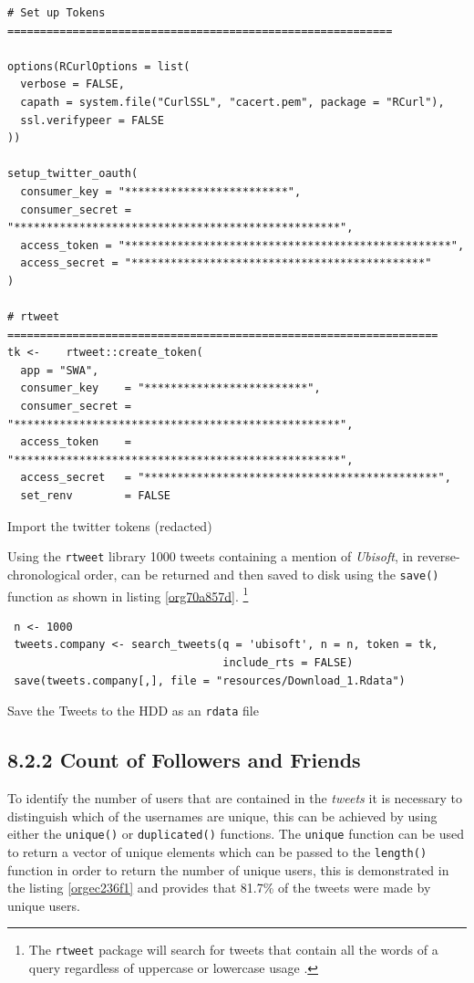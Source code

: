 \documentclass[11pt]{article}
\begin{document}
\begin{listing}[htbp]
\begin{verbatim}
# Set up Tokens ===========================================================

options(RCurlOptions = list(
  verbose = FALSE,
  capath = system.file("CurlSSL", "cacert.pem", package = "RCurl"),
  ssl.verifypeer = FALSE
))

setup_twitter_oauth(
  consumer_key = "*************************",
  consumer_secret = "**************************************************",
  access_token = "**************************************************",
  access_secret = "*********************************************"
)

# rtweet ==================================================================
tk <-    rtweet::create_token(
  app = "SWA",
  consumer_key    = "*************************",
  consumer_secret = "**************************************************",
  access_token    = "**************************************************",
  access_secret   = "*********************************************",
  set_renv        = FALSE
\end{verbatim}
\caption{\label{org568a978}Import the twitter tokens (redacted)}
\end{listing}

Using the \texttt{rtweet} library 1000 tweets containing a mention of \emph{Ubisoft}, in
reverse-chronological order, can be returned and then saved to disk using the
\texttt{save()} function as shown in listing \ref{org70a857d}. \footnote{The \texttt{rtweet} package will search for tweets that contain all the words of a query
regardless of uppercase or lowercase usage \cite{kearney2019}.}

\begin{listing}[htbp]
\begin{verbatim}
 n <- 1000
 tweets.company <- search_tweets(q = 'ubisoft', n = n, token = tk,
                                 include_rts = FALSE)
 save(tweets.company[,], file = "resources/Download_1.Rdata")
\end{verbatim}
\caption{\label{org70a857d}Save the Tweets to the HDD as an \texttt{rdata} file}
\end{listing}

\subsection{8.2.2 Count of Followers and Friends}
\label{sec:org7e08fb2}
To identify the number of users that are contained in the \emph{tweets} it
is necessary to distinguish which of the usernames are unique, this can be
achieved by using either the \texttt{unique()} or \texttt{duplicated()} functions. The
\texttt{unique} function can be used to return a vector of unique elements which can be
passed to the \texttt{length()} function in order to return the number of unique users,
this is demonstrated in the listing \ref{orgec236f1} and provides that 81.7\% of the tweets were
made by unique users.
\end{document}
